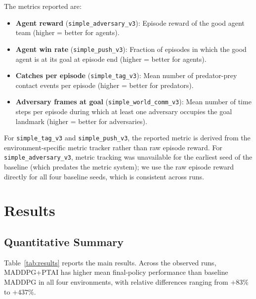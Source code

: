 \documentclass[12pt]{article}
\begin{document}
The metrics reported are:
\begin{itemize}
  \item \textbf{Agent reward} (\texttt{simple\_adversary\_v3}): Episode reward of the
        good agent team (higher = better for agents).
  \item \textbf{Agent win rate} (\texttt{simple\_push\_v3}): Fraction of episodes in
        which the good agent is at its goal at episode end (higher = better for agents).
  \item \textbf{Catches per episode} (\texttt{simple\_tag\_v3}): Mean number of
        predator-prey contact events per episode (higher = better for predators).
  \item \textbf{Adversary frames at goal} (\texttt{simple\_world\_comm\_v3}): Mean
        number of time steps per episode during which at least one adversary occupies the
        goal landmark (higher = better for adversaries).
\end{itemize}

For \texttt{simple\_tag\_v3} and \texttt{simple\_push\_v3}, the reported metric is
derived from the environment-specific metric tracker rather than raw episode reward.
For \texttt{simple\_adversary\_v3}, metric tracking was unavailable for the earliest seed
of the baseline (which predates the metric system); we use the raw episode reward directly
for all four baseline seeds, which is consistent across runs.

\section{Results}

\subsection{Quantitative Summary}

Table~\ref{tab:results} reports the main results. Across the observed runs, MADDPG+PTAI
has higher mean final-policy performance than baseline MADDPG in all four environments,
with relative differences ranging from $+83\%$ to $+437\%$.
\end{document}
